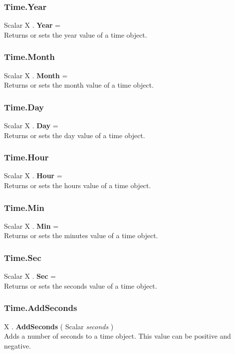 \documentclass[10pt]{book}
\begin{document}
\subsubsection{Time.Year \label{F:Time:Year}}
Scalar X . \textbf{Year} = \\
Returns or sets the year value of a time object.

\subsubsection{Time.Month \label{F:Time:Month}}
Scalar X . \textbf{Month} = \\
Returns or sets the month value of a time object.

\subsubsection{Time.Day \label{F:Time:Day}}
Scalar X . \textbf{Day} = \\
Returns or sets the day value of a time object.


\subsubsection{Time.Hour \label{F:Time:Hour}}
Scalar X . \textbf{Hour} = \\
Returns or sets the hours value of a time object.


\subsubsection{Time.Min \label{F:Time:Min}}
Scalar X . \textbf{Min} = \\
Returns or sets the minutes value of a time object.


\subsubsection{Time.Sec \label{F:Time:Sec}}
Scalar X . \textbf{Sec} = \\
Returns or sets the seconds value of a time object.


\subsubsection{Time.AddSeconds \label{F:Time:AddSeconds}}
X . \textbf{AddSeconds} ( Scalar \textit{seconds} ) \\
Adds a number of seconds to a time object. This value can be positive and negative.
\end{document}
